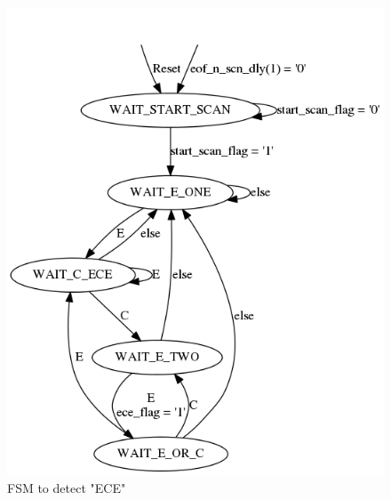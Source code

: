 \documentclass{article}
\begin{document}
	\begin{figure}[h]
		\begin{center}
			\includegraphics[scale=0.45]{../graphviz/part_3_state_diagram_ECE.png}
			\caption{FSM to detect "ECE"}
		\end{center}
	\end{figure}
\end{document}
